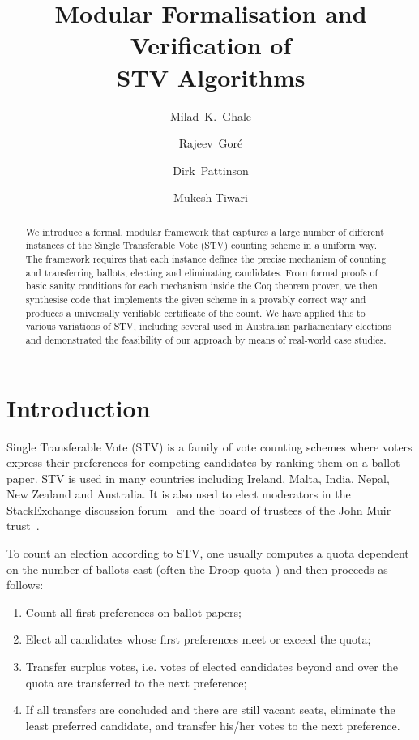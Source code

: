 \documentclass{llncs}
\title{Modular Formalisation and Verification of \\STV Algorithms}
\author{Milad~K.~Ghale \orcidID{0000-0002-1895-9477}
   \and Rajeev~Gor\'e
   \and Dirk~Pattinson \orcidID{0000-0002-5832-6666}
   \and Mukesh Tiwari \orcidID{0000-0001-5373-9659}}
\institute{The Australian National University
\email{\{milad.ketabghale,rajeev.gore,dirk.pattinson,mukesh.tiwari\}@anu.edu.au}
}
\begin{document}
\maketitle
\pagestyle{plain}
\thispagestyle{empty}
\begin{abstract}
We introduce a formal, modular framework that captures a large number of
different instances of the Single Transferable Vote (STV) counting
scheme in a uniform way. The framework requires that each instance
defines the precise mechanism of counting and transferring ballots,
electing and eliminating candidates. From formal proofs of basic
sanity conditions for each mechanism inside the Coq theorem prover, we then synthesise
code that implements the given scheme in a provably correct way and
produces a universally verifiable certificate of the count. We have
applied this to various variations of STV, including several  used in Australian
parliamentary elections and demonstrated the feasibility of our
approach by means of real-world case studies.
\end{abstract}

\section{Introduction}
 Single Transferable Vote (STV) is a family of 
 vote counting schemes where voters express their 
 preferences for competing candidates by ranking them on a ballot
 paper. STV is used
in many 
 countries including Ireland, Malta, India, Nepal, New Zealand and
 Australia. It is also used to elect moderators in the
 StackExchange discussion forum~\cite{StackExchange:2018:ME} and the
 board of trustees of the John Muir trust~\cite{Trust:2018:AT}. 

 To count an election according to STV, one usually computes a quota
 dependent on the number of ballots cast (often the Droop quota
 \cite{Droop:1881:MER}) and then proceeds as follows:
 \begin{enumerate}
 \item Count all first preferences on ballot papers;
 \item Elect all candidates whose first preferences meet or exceed the
 quota;
 \item Transfer surplus votes, i.e. votes of elected candidates beyond and
 over the quota are transferred to the next preference;
 \item If all transfers are concluded and there are still vacant
 seats, eliminate the least preferred candidate, and transfer his/her  votes
 to the next preference.
 \end{enumerate}
\end{document}
